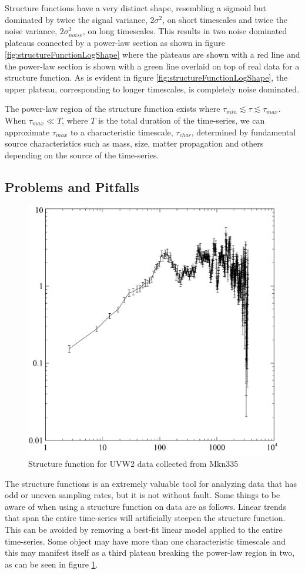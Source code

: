 \documentclass[12pt, oneside]{smuthesis}
\begin{document}
Structure functions have a very distinct shape, resembling a sigmoid but dominated by twice the signal variance, $2\sigma^{2}$, on short timescales and twice the noise variance, $2\sigma_{noise}^{2}$, on long timescales. This results in two noise dominated plateaus connected by a power-law section as shown in figure \ref{fig:structureFunctionLogShape} where the plateaus are shown with a red line and the power-law section is shown with a green line overlaid on top of real data for a structure function. As is evident in figure \ref{fig:structureFunctionLogShape}, the upper plateau, corresponding to longer timescales, is completely noise dominated.

The power-law region of the structure function exists where $\tau_{min}\lesssim\tau\lesssim\tau_{max}$. When $\tau_{max}\ll T$, where $T$ is the total duration of the time-series, we can approximate $\tau_{max}$ to a characteristic timescale, $\tau_{char}$, determined by fundamental source characteristics such as mass, size, matter propagation and others depending on the source of the time-series.

\subsection{\sc Problems and Pitfalls} \label{problemsAndPitfalls}

\begin{figure}[H]
	\centering
	\includegraphics[width=0.4\linewidth]{mkn335UVW2SF}
	\caption{Structure function for UVW2 data collected from Mkn335}
	\label{fig:mkn335UVW2SF}
\end{figure}

The structure functions is an extremely valuable tool for analyzing data that has odd or uneven sampling rates, but it is not without fault. Some things to be aware of when using a structure function on data are as follows. Linear trends that span the entire time-series will artificially steepen the structure function. This can be avoided by removing a best-fit linear model applied to the entire time-series. Some object may have more than one characteristic timescale and this may manifest itself as a third plateau breaking the power-law region in two, as can be seen in figure \ref{fig:mkn335UVW2SF}.
\end{document}
